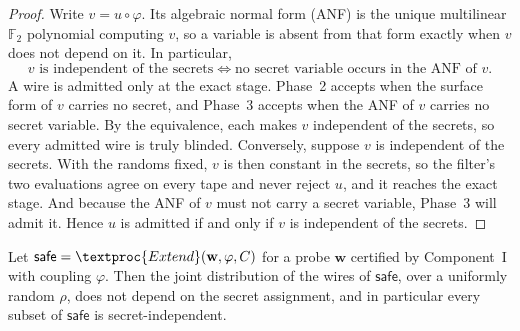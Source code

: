   \begin{proof}
  Write $v = u \circ \varphi$. Its algebraic normal form (ANF) is the unique
  multilinear $\mathbb{F}_2$ polynomial computing $v$, so a variable is absent from
  that form exactly when $v$ does not depend on it. In particular,
  \[
    v \text{ is independent of the secrets}
    \iff
    \text{no secret variable occurs in the ANF of } v .
  \]
  A wire is admitted only at the exact stage. Phase~2 accepts when the surface form
  of $v$ carries no secret, and Phase~3 accepts when the ANF of $v$ carries no
  secret variable. By the equivalence, each makes $v$ independent of the secrets, so
  every admitted wire is truly blinded. Conversely, suppose $v$ is independent of the
  secrets. With the randoms fixed, $v$ is then constant in the secrets, so the
  filter's two evaluations agree on every tape and never reject $u$, and it reaches
  the exact stage. And because the ANF of $v$ must not carry a secret variable, Phase~3
  will admit it. Hence $u$ is admitted if and only if $v$ is independent of the secrets.
  \end{proof}

  \begin{theorem}
  \label{thm:safe-set}
  Let $\mathsf{safe} = \textproc{Extend}(\mathbf{w}, \varphi, C)$ for a probe
  $\mathbf{w}$ certified by Component~I with coupling $\varphi$. Then the joint
  distribution of the wires of $\mathsf{safe}$, over a uniformly random $\rho$, does
  not depend on the secret assignment, and in particular every subset of
  $\mathsf{safe}$ is secret-independent.
  \end{theorem}

